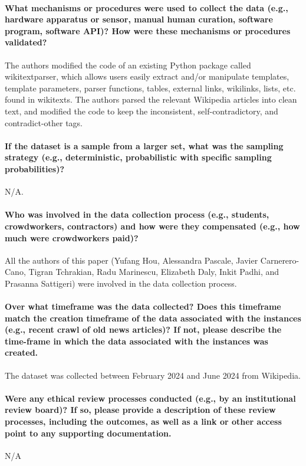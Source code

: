 \documentclass{article}
\begin{document}
\paragraph{What mechanisms or procedures were used to collect the data (e.g., hardware apparatus or sensor, manual human curation, software program, software API)? How were these mechanisms or procedures validated? }
The authors modified the code of an existing Python package called wikitextparser, which allows users easily extract and/or manipulate templates, template parameters, parser functions, tables, external links, wikilinks, lists, etc. found in wikitexts. The authors parsed the relevant Wikipedia articles into clean text, and modified the code to keep the inconsistent, self-contradictory, and contradict-other tags.



\paragraph{If the dataset is a sample from a larger set, what was the sampling strategy (e.g., deterministic,
probabilistic with specific sampling probabilities)? }
N/A.

\paragraph{Who was involved in the data collection process (e.g., students, crowdworkers, contractors) and how were they compensated (e.g., how much were crowdworkers paid)?}
All the authors of this paper (Yufang Hou, Alessandra Pascale, Javier Carnerero-Cano, Tigran Tchrakian, Radu Marinescu, Elizabeth Daly, Inkit Padhi, and Prasanna Sattigeri) were involved in the data collection process.

\paragraph{Over what timeframe was the data collected? Does this timeframe match the creation timeframe of the data associated with the instances (e.g., recent crawl of old news articles)? If not, please describe the time-frame in which the data associated with the instances was created.}
The dataset was collected between February 2024 and June 2024 from Wikipedia.

\paragraph{Were any ethical review processes conducted (e.g., by an institutional review board)? If so, please provide a description of these review processes, including the outcomes, as well as a link
or other access point to any supporting documentation.}
N/A
\end{document}
